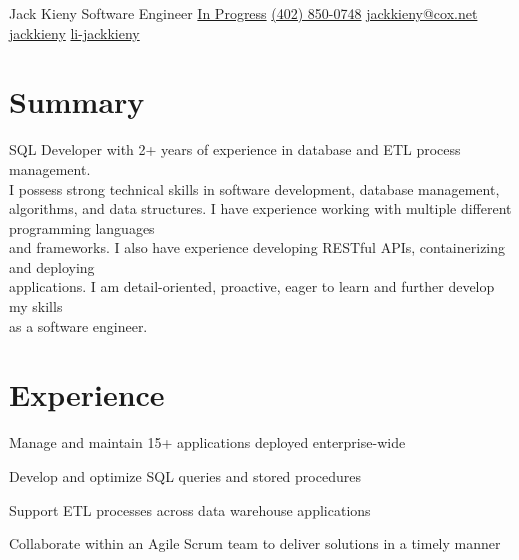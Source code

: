 \documentclass[]{latex/resume}
\begin{document}
%
%

\namesection
    {Jack}
    {Kieny}
    {Software Engineer}
    {\contactline
        {\href{}{In Progress}}
        {\href{tel:+1402850047}{(402) 850-0748}}
        {\href{mailto:jackkieny@cox.net}{jackkieny@cox.net}}
        {\href{https://www.github.com/jackkieny}{jackkieny}}
        {\href{https://www.linkedin.com/in/jackkieny}{li-jackkieny}}
    }       
        

%
%

\begin{minipage}[t]{0.75\textwidth} 

\section{Summary}
SQL Developer with 2+ years of experience in database and ETL process management. \\
I possess strong technical skills in software development, database management, algorithms, and data structures.
I have experience working with multiple different programming languages\\and frameworks. I also have experience developing RESTful APIs, containerizing and deploying\\applications.
I am detail-oriented, proactive, eager to learn and further develop my skills\\as a software engineer.


\sectionsep


\section{Experience}
     
    \vspace{\topsep} %
    \begin{tightemize}
        \sectionsep
            \item Manage and maintain 15+ applications deployed enterprise-wide
            \item Develop and optimize SQL queries and stored procedures
            \item Support ETL processes across data warehouse applications
            \item Collaborate within an Agile Scrum team to deliver solutions in a timely manner
        \end{tightemize}
    

\end{minipage}
\end{document}
